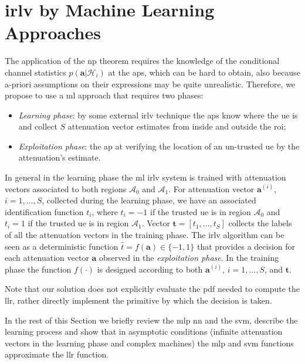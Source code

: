 \documentclass[draftcls,onecolumn,12pt]{IEEEtran}
\newcommand{\ai}{\bm{a}^{(i)}}
\begin{document}
\section{\Ac{irlv} by Machine Learning Approaches}


The application of the \ac{np} theorem requires the knowledge of the conditional channel statistics $p(\bm{a}|\mathcal{H}_i)$ at the \acp{ap}, which can be hard to obtain, also because a-priori assumptions on their expressions may be quite unrealistic. 
 Therefore, we propose to use a \ac{ml} approach that requires two phases:
\begin{itemize}
    \item {\em Learning phase}:  by some external \ac{irlv} technique the \acp{ap} know where the \ac{ue} is and  collect $S$ attenuation vector estimates from inside and outside the \ac{roi};
    \item {\em Exploitation phase}: the \ac{ap} at verifying the location of an un-trusted \ac{ue} by the attenuation's estimate. 
\end{itemize}

In general in the learning phase the \ac{ml}   \ac{irlv} system is trained with attenuation vectors associated to both regions $\mathcal{A}_0$ and $\mathcal{A}_1$. For  attenuation vector $\ai$,  $i=1, \ldots, S$,  collected during the learning phase, we have an associated identification function $t_i$, where $t_i= -1$ if the trusted \ac{ue} is in region $\mathcal{A}_0$ and $t_i = 1$ if the trusted \ac{ue} is in region $\mathcal{A}_1$. Vector $\bm{t}=[t_1, \ldots, t_S]$ collects the labels of all the  attenuation vectors in the training phase. The \ac{irlv} algorithm can be seen as  a deterministic function $\hat{t} = f(\bm{a})\in \{-1, 1\}$ that provides a decision for each attenuation vector $\bm{a}$ observed in the {\em exploitation phase}. In the training phase the function  $f(\cdot)$ is designed according to both $\bm{a}^{(i)}$, $i=1, \ldots, S$, and  $\bm{t}$.

Note that our solution does not explicitly evaluate the \ac{pdf} needed to compute the \ac{llr}, rather directly implement the primitive by which the decision is taken.

In the rest of this Section we  briefly review the \ac{mlp} \ac{nn} and the \ac{svm}, describe the learning process  and show that in asymptotic conditions (infinite attenuation vectors in the learning phase and complex machines) the \ac{mlp} and \ac{svm} functions approximate the \ac{llr} function.
  
\end{document}
